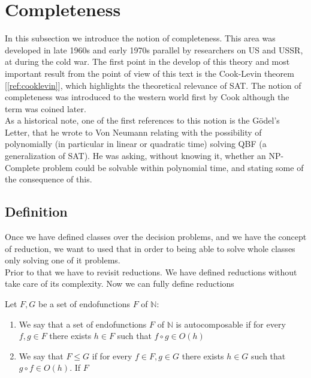 \section{Completeness}

In this subsection we introduce the notion of completeness. This area was developed in late 1960s and early 1970s parallel by researchers on US and USSR, at during the cold war. The first point in the develop of this theory and most important result from the point of view of this text is the Cook-Levin theorem [\ref{ref:cooklevin}], which highlights the theoretical relevance of SAT. The notion of completeness was introduced to the western world first by Cook \cite{cook1971complexity} although the term was coined later. \\

As a historical note, one of the first references to this notion is the Gödel's Letter\cite{hartmanis1993godel}, that he wrote to Von Neumann relating with the possibility of polynomially (in particular in linear or quadratic time) solving QBF (a generalization of SAT). He was asking, without knowing it, whether an NP-Complete problem could be solvable within polynomial time, and stating some of the consequence of this.\\



\subsection{Definition}

Once we have defined classes over the decision problems, and we have the concept of reduction, we want to used that in order to being able to solve whole classes only solving one of it problems.\\

Prior to that we have to revisit reductions. We have defined reductions without take care of its complexity. Now we can fully define reductions

\begin{definition}
  Let $F,G$ be a set of endofunctions $F$ of $\mathbb{N}$:
  \begin{enumerate}
  \item  We say that a set of endofunctions $F$ of $\mathbb{N}$ is autocomposable if for every $f,g\in F$ there exists $h\in F$ such that $f\circ g \in O(h)$
  \item We say that $F\le G$ if for every $f \in F, g \in G$ there exists $h\in G$ such that $g\circ f \in O(h)$. If $F$
  \end{enumerate}
\end{definition}


